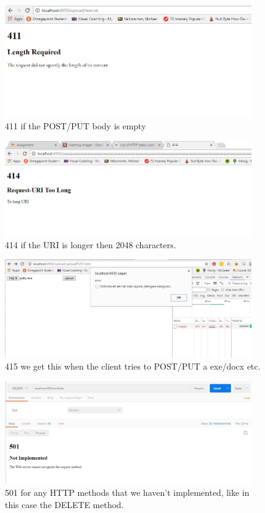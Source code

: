 \documentclass[a4paper,12pt]{article}
\numberwithin{figure}{section}
\begin{document}
\begin{figure}[h!]
	\centering
	\label{411}
	\includegraphics[width=0.95\textwidth,keepaspectratio]{img/411.jpg} 
	\caption{411 if the POST/PUT body is empty}
\end{figure}

\begin{figure}[h!]
	\centering
	\label{414}
	\includegraphics[width=0.95\textwidth,keepaspectratio]{img/414.jpg} 
	\caption{414 if the URI is longer then 2048 characters.}
\end{figure}

\begin{figure}[h!]
	\centering
	\label{415}
	\includegraphics[width=0.95\textwidth,keepaspectratio]{img/415.jpg} 
	\caption{415 we get this when the client tries to POST/PUT a exe/docx etc.}
\end{figure}

\begin{figure}[h!]
	\centering
	\label{501}
	\includegraphics[width=0.95\textwidth,keepaspectratio]{img/501.jpg} 
	\caption{501 for any HTTP methods that we haven't implemented, like in this case the DELETE method.}
\end{figure}
\end{document}
